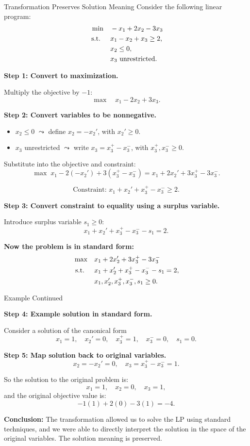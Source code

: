 \begin{example}{Transformation Preserves Solution Meaning}\label{exa:canonical-map-example}
Consider the following linear program:
\[
\begin{aligned}
\min \quad & -x_1 + 2x_2 - 3x_3 \\
\mbox{ s.t. } \quad
& x_1 - x_2 + x_3 \geq 2, \\
& x_2 \leq 0, \\
& x_3 \mbox{ unrestricted}.
\end{aligned}
\]

\textbf{Step 1: Convert to maximization.}

Multiply the objective by \( -1 \):
\[
\max \quad x_1 - 2x_2 + 3x_3.
\]

\textbf{Step 2: Convert variables to be nonnegative.}

\begin{itemize}
    \item \( x_2 \leq 0 \) \( \leadsto \) define \( x_2 = -x_2' \), with \( x_2' \geq 0 \).
    \item \( x_3 \) unrestricted \( \leadsto \) write \( x_3 = x_3^+ - x_3^- \), with \( x_3^+, x_3^- \geq 0 \).
\end{itemize}

Substitute into the objective and constraint:
\[
\max \; x_1 - 2(-x_2') + 3(x_3^+ - x_3^-) = x_1 + 2x_2' + 3x_3^+ - 3x_3^-.
\]

\[
\text{Constraint: } x_1 + x_2' + x_3^+ - x_3^- \geq 2.
\]

\textbf{Step 3: Convert constraint to equality using a surplus variable.}

Introduce surplus variable \( s_1 \geq 0 \):
\[
x_1 + x_2' + x_3^+ - x_3^- - s_1 = 2.
\]

\textbf{Now the problem is in standard form:}
\[
\begin{aligned}
\max \quad & x_1 + 2x_2' + 3x_3^+ - 3x_3^- \\
\mbox{ s.t. } \quad & x_1 + x_2' + x_3^+ - x_3^- - s_1 = 2, \\
& x_1, x_2', x_3^+, x_3^-, s_1 \geq 0.
\end{aligned}
\]
\end{example}

\begin{example}{Example Continued}
\medskip

\textbf{Step 4: Example solution in standard form.}

Consider a solution of the canonical form
\[
x_1 = 1, \quad x_2' = 0, \quad x_3^+ = 1, \quad x_3^- = 0, \quad s_1 = 0.
\]

\textbf{Step 5: Map solution back to original variables.}
\[
x_2 = -x_2' = 0, \quad x_3 = x_3^+ - x_3^- = 1.
\]

So the solution to the original problem is:
\[
x_1 = 1, \quad x_2 = 0, \quad x_3 = 1,
\]
and the original objective value is:
\[
-1(1) + 2(0) - 3(1) = -4.
\]

\medskip

\textbf{Conclusion:} The transformation allowed us to solve the LP using standard techniques, and we were able to directly interpret the solution in the space of the original variables. The solution meaning is preserved.
\end{example}

